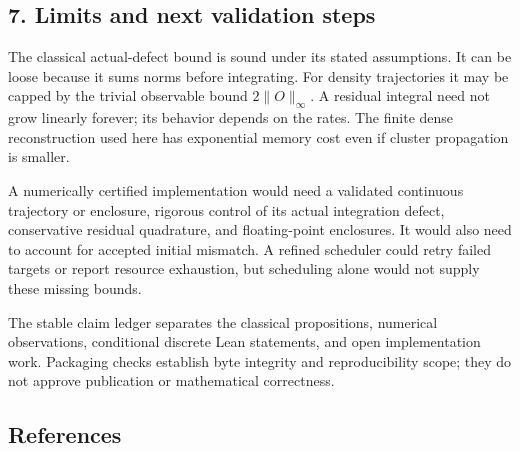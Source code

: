 \documentclass[
]{article}
\begin{document}
\subsection{7. Limits and next validation steps}\label{limits-and-next-validation-steps}

The classical actual-defect bound is sound under its stated assumptions. It can be loose because it sums norms before integrating. For density trajectories it may be capped by the trivial observable bound \(2\|O\|_\infty\). A residual integral need not grow linearly forever; its behavior depends on the rates. The finite dense reconstruction used here has exponential memory cost even if cluster propagation is smaller.

A numerically certified implementation would need a validated continuous trajectory or enclosure, rigorous control of its actual integration defect, conservative residual quadrature, and floating-point enclosures. It would also need to account for accepted initial mismatch. A refined scheduler could retry failed targets or report resource exhaustion, but scheduling alone would not supply these missing bounds.

The stable claim ledger separates the classical propositions, numerical observations, conditional discrete Lean statements, and open implementation work. Packaging checks establish byte integrity and reproducibility scope; they do not approve publication or mathematical correctness.

\subsection{References}\label{references}
\end{document}

